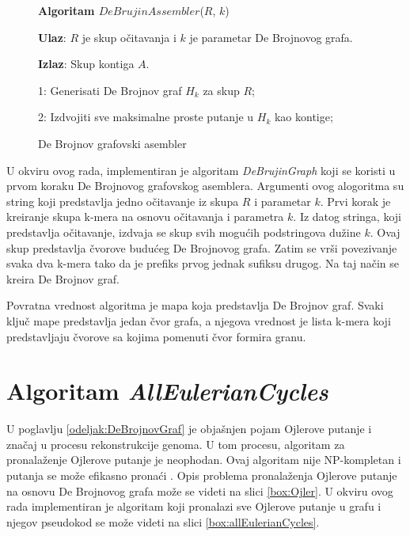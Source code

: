 \documentclass[12pt,oneside]{memoir}
\begin{document}
\begin{figure}[!ht]
\begin{tcolorbox}
\textbf{Algoritam $DeBrujinAssembler$}($R$, $k$)

\textbf{Ulaz}: $R$ je skup očitavanja i $k$ je parametar De Brojnovog grafa.

\textbf{Izlaz}: Skup kontiga $A$.

1: Generisati De Brojnov graf $H_k$ za skup $R$;

2: Izdvojiti sve maksimalne proste putanje u $H_k$ kao kontige;

\end{tcolorbox}
\caption{De Brojnov grafovski asembler \cite{WingKinSung}}
\label{box:DeBrujinAssembler}
\end{figure}

U okviru ovog rada, implementiran je algoritam \textit{DeBrujinGraph} koji se koristi u prvom koraku De Brojnovog grafovskog asemblera. Argumenti ovog alogoritma su string koji predstavlja jedno očitavanje iz skupa $R$ i parametar $k$. Prvi korak je kreiranje skupa k-mera na osnovu očitavanja i parametra $k$. Iz datog stringa, koji predstavlja očitavanje, izdvaja se skup svih mogućih podstringova dužine $k$. Ovaj skup predstavlja čvorove budućeg De Brojnovog grafa. Zatim se vrši povezivanje svaka dva k-mera tako da je prefiks prvog jednak sufiksu drugog. Na taj način se kreira De Brojnov graf.

Povratna vrednost algoritma je mapa koja predstavlja De Brojnov graf. Svaki ključ mape predstavlja jedan čvor grafa, a njegova vrednost je lista k-mera koji predstavljaju čvorove sa kojima pomenuti čvor formira granu.

\section{Algoritam \textit{AllEulerianCycles}}

U poglavlju \ref{odeljak:DeBrojnovGraf} je objašnjen pojam  Ojlerove putanje i značaj u procesu rekonstrukcije genoma. U tom procesu, algoritam za pronalaženje Ojlerove putanje je neophodan. Ovaj algoritam nije NP-kompletan i putanja se može efikasno pronaći \cite{skriptaBio}. Opis problema pronalaženja Ojlerove putanje na osnovu De Brojnovog grafa može se videti na slici \ref{box:Ojler}. U okviru ovog rada implementiran je algoritam koji pronalazi sve Ojlerove putanje u grafu i njegov pseudokod se može videti na slici \ref{box:allEulerianCycles}. 
\vspace{0.2cm}
\end{document}
